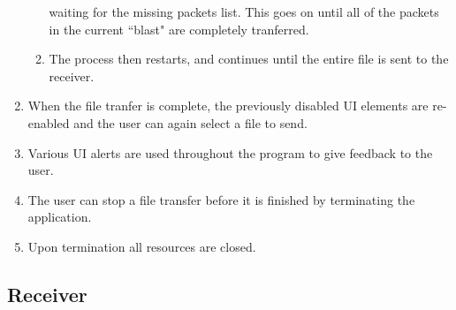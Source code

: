 \documentclass[10pt, a4paper]{article}
\begin{document}
\begin{enumerate}
\begin{enumerate}
        waiting for the missing packets list. This goes on until all of the
        packets in the current ``blast" are completely tranferred.
      \item The process then restarts, and continues until the entire file is
        sent to the receiver.
    \end{enumerate}
  \item When the file tranfer is complete, the previously disabled UI elements
    are re-enabled and the user can again select a file to send.
  \item Various UI alerts are used throughout the program to give feedback to
    the user.
  \item The user can stop a file transfer before it is finished by terminating
    the application.
  \item Upon termination all resources are closed.
\end{enumerate}

\subsection{Receiver}
\label{subsec:prog-desc-receiver}
\end{document}
